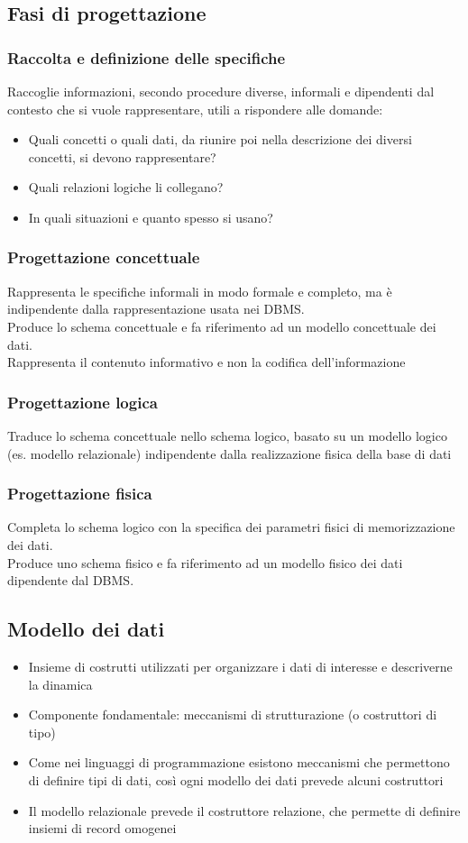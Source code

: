 \documentclass[../main.tex]{subfiles}
\begin{document}
	\subsection{Fasi di progettazione}
	\subsubsection{Raccolta e definizione delle specifiche}
	Raccoglie informazioni, secondo procedure diverse, informali e dipendenti dal contesto che si vuole rappresentare, utili a rispondere alle domande:
	\begin{itemize}
		\item Quali concetti o quali dati, da riunire poi nella descrizione dei diversi concetti, si devono rappresentare?
		\item Quali relazioni logiche li collegano?
		\item In quali situazioni e quanto spesso si usano?
	\end{itemize}
	\subsubsection{Progettazione concettuale}
	Rappresenta le specifiche informali in modo formale e completo, ma è indipendente dalla rappresentazione usata nei DBMS.\\
	Produce lo schema concettuale e fa riferimento ad un modello concettuale dei dati. \\
	Rappresenta il contenuto informativo e non la codifica dell’informazione
	\subsubsection{Progettazione logica}
	Traduce lo schema concettuale nello schema logico, basato su un modello logico (es. modello relazionale) indipendente dalla realizzazione fisica della base di dati
	\subsubsection{Progettazione fisica}
	Completa lo schema logico con la specifica dei parametri fisici di memorizzazione dei dati. \\
	Produce uno schema fisico e fa riferimento ad un modello fisico dei dati dipendente dal DBMS.
	\subsection{Modello dei dati}
	\begin{itemize}
		\item Insieme di costrutti utilizzati per organizzare i dati di interesse e descriverne la dinamica
		\item Componente fondamentale: meccanismi di strutturazione (o costruttori di tipo)
		\item Come nei linguaggi di programmazione esistono meccanismi che permettono di definire tipi di dati, così ogni modello dei dati prevede alcuni costruttori
		\item Il modello relazionale prevede il costruttore relazione, che permette di definire insiemi di record omogenei
	\end{itemize}
\end{document}
